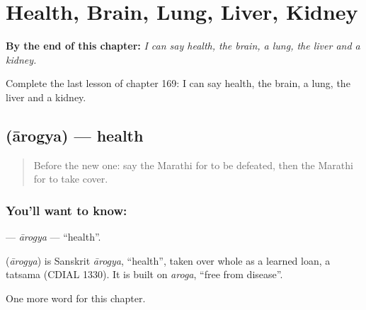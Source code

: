 
\chapter{Health, Brain, Lung, Liver, Kidney}
\label{ch:mr-health-brain-lung-liver-kidney}

\begin{chapteropening}
\textbf{By the end of this chapter:} \emph{I can say health, the brain, a lung, the liver and a kidney.}

Complete the last lesson of chapter 169: I can say health, the brain, a lung, the liver and a kidney.
\end{chapteropening}

\section[\texorpdfstring{\mr{आरोग्य} (ārogya)}{आरोग्य (ārogya)}]{ (ārogya) — health}

\label{lesson:MR-C169-arogya}



\begin{quote}
Before the new one: say the Marathi for to be defeated, then the Marathi for to take cover.
\end{quote}

\subsection*{You'll want to know: }
\textbf{} — \emph{ārogya} — \textquotedblleft{}health\textquotedblright{}.

\begin{cousinweb}
\textbf{} (\emph{ārogya}) is Sanskrit \emph{ārogya}, \textquotedblleft{}health\textquotedblright{}, taken over whole as a learned loan, a tatsama (CDIAL 1330). It is built on \emph{aroga}, \textquotedblleft{}free from disease\textquotedblright{}.
\end{cousinweb}

\begin{grammarlens}[title={What you've built}]
One more word for this chapter.
\end{grammarlens}

